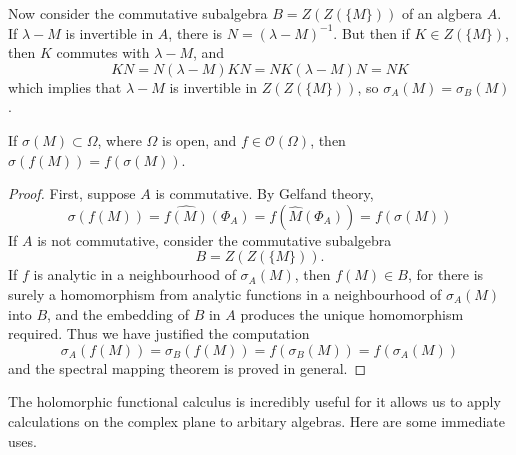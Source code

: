 Now consider the commutative subalgebra $B = Z(Z(\{ M \}))$ of an algbera $A$. If $\lambda - M$ is invertible in $A$, there is $N = (\lambda - M)^{-1}$. But then if $K \in Z(\{ M \})$, then $K$ commutes with $\lambda - M$, and
%
\[ KN = N(\lambda - M) K N = NK (\lambda - M) N = NK \]
%
which implies that $\lambda - M$ is invertible in $Z(Z(\{M\}))$, so $\sigma_A(M) = \sigma_B(M)$.

\begin{theorem}
    If $\sigma(M) \subset \Omega$, where $\Omega$ is open, and $f \in \mathcal{O}(\Omega)$, then $\sigma(f(M)) = f(\sigma(M))$.
\end{theorem}
\begin{proof}
    First, suppose $A$ is commutative. By Gelfand theory,
    \[ \sigma(f(M)) = \widehat{f(M)}(\Phi_A) = f(\widehat{M}(\Phi_A)) = f(\sigma(M)) \]
    If $A$ is not commutative, consider the commutative subalgebra
    \[ B = Z(Z(\{M\})). \]
    If $f$ is analytic in a neighbourhood of $\sigma_A(M)$, then $f(M) \in B$, for there is surely a homomorphism from analytic functions in a neighbourhood of $\sigma_A(M)$ into $B$, and the embedding of $B$ in $A$ produces the unique homomorphism required. Thus we have justified the computation
    \[ \sigma_A(f(M)) = \sigma_B(f(M)) = f(\sigma_B(M)) = f(\sigma_A(M)) \]
    and the spectral mapping theorem is proved in general.
\end{proof}

The holomorphic functional calculus is incredibly useful for it allows us to apply calculations on the complex plane to arbitary algebras. Here are some immediate uses.

